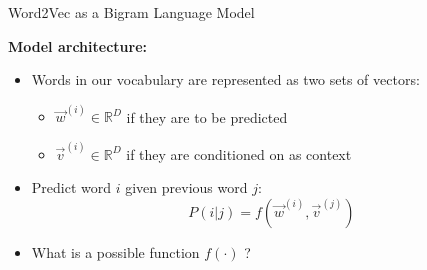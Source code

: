 






\begin{vbframe}{Word2Vec as a Bigram Language Model}

\vfill

\textbf{Model architecture:}

\begin{itemize}
	\item Words in our vocabulary are represented as two sets of vectors:
		\begin{itemize}
			 \item $\vec w^{(i)} \in \mathbb{R}^D$ if they are to be predicted
			 \item $\vec v^{(i)} \in \mathbb{R}^D$ if they are conditioned on as context
		\end{itemize}
	\item Predict word $i$ given previous word $j$: $$P(i|j) = f(\vec w^{(i)}, \vec v^{(j)})$$
	\item \ques What is a possible function $f(\cdot)$ ?
\end{itemize}

\vfill

\end{vbframe}

